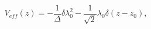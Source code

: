 \begin{equation}
V_{eff}(z) = - \frac{1}{\Delta} \delta \lambda_{0}^{2}
- \frac{1}{\sqrt{2}} \lambda_{0} \delta(z - z_{0}),
\label{eq:nobarrier}
\end{equation}

